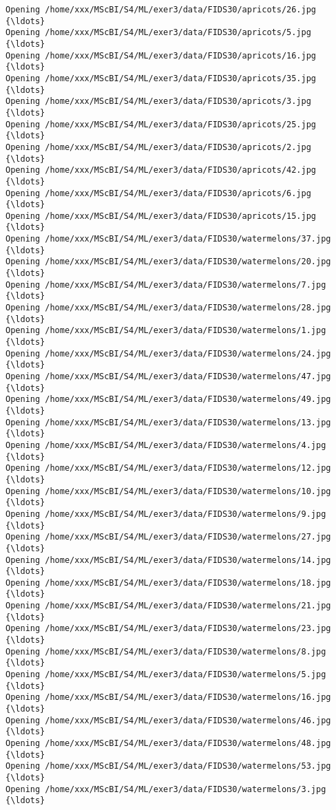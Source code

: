\documentclass[11pt]{article}
\begin{document}
\begin{Verbatim}[commandchars=\\\{\}]
Opening /home/xxx/MScBI/S4/ML/exer3/data/FIDS30/apricots/26.jpg  {\ldots}
Opening /home/xxx/MScBI/S4/ML/exer3/data/FIDS30/apricots/5.jpg  {\ldots}
Opening /home/xxx/MScBI/S4/ML/exer3/data/FIDS30/apricots/16.jpg  {\ldots}
Opening /home/xxx/MScBI/S4/ML/exer3/data/FIDS30/apricots/35.jpg  {\ldots}
Opening /home/xxx/MScBI/S4/ML/exer3/data/FIDS30/apricots/3.jpg  {\ldots}
Opening /home/xxx/MScBI/S4/ML/exer3/data/FIDS30/apricots/25.jpg  {\ldots}
Opening /home/xxx/MScBI/S4/ML/exer3/data/FIDS30/apricots/2.jpg  {\ldots}
Opening /home/xxx/MScBI/S4/ML/exer3/data/FIDS30/apricots/42.jpg  {\ldots}
Opening /home/xxx/MScBI/S4/ML/exer3/data/FIDS30/apricots/6.jpg  {\ldots}
Opening /home/xxx/MScBI/S4/ML/exer3/data/FIDS30/apricots/15.jpg  {\ldots}
Opening /home/xxx/MScBI/S4/ML/exer3/data/FIDS30/watermelons/37.jpg  {\ldots}
Opening /home/xxx/MScBI/S4/ML/exer3/data/FIDS30/watermelons/20.jpg  {\ldots}
Opening /home/xxx/MScBI/S4/ML/exer3/data/FIDS30/watermelons/7.jpg  {\ldots}
Opening /home/xxx/MScBI/S4/ML/exer3/data/FIDS30/watermelons/28.jpg  {\ldots}
Opening /home/xxx/MScBI/S4/ML/exer3/data/FIDS30/watermelons/1.jpg  {\ldots}
Opening /home/xxx/MScBI/S4/ML/exer3/data/FIDS30/watermelons/24.jpg  {\ldots}
Opening /home/xxx/MScBI/S4/ML/exer3/data/FIDS30/watermelons/47.jpg  {\ldots}
Opening /home/xxx/MScBI/S4/ML/exer3/data/FIDS30/watermelons/49.jpg  {\ldots}
Opening /home/xxx/MScBI/S4/ML/exer3/data/FIDS30/watermelons/13.jpg  {\ldots}
Opening /home/xxx/MScBI/S4/ML/exer3/data/FIDS30/watermelons/4.jpg  {\ldots}
Opening /home/xxx/MScBI/S4/ML/exer3/data/FIDS30/watermelons/12.jpg  {\ldots}
Opening /home/xxx/MScBI/S4/ML/exer3/data/FIDS30/watermelons/10.jpg  {\ldots}
Opening /home/xxx/MScBI/S4/ML/exer3/data/FIDS30/watermelons/9.jpg  {\ldots}
Opening /home/xxx/MScBI/S4/ML/exer3/data/FIDS30/watermelons/27.jpg  {\ldots}
Opening /home/xxx/MScBI/S4/ML/exer3/data/FIDS30/watermelons/14.jpg  {\ldots}
Opening /home/xxx/MScBI/S4/ML/exer3/data/FIDS30/watermelons/18.jpg  {\ldots}
Opening /home/xxx/MScBI/S4/ML/exer3/data/FIDS30/watermelons/21.jpg  {\ldots}
Opening /home/xxx/MScBI/S4/ML/exer3/data/FIDS30/watermelons/23.jpg  {\ldots}
Opening /home/xxx/MScBI/S4/ML/exer3/data/FIDS30/watermelons/8.jpg  {\ldots}
Opening /home/xxx/MScBI/S4/ML/exer3/data/FIDS30/watermelons/5.jpg  {\ldots}
Opening /home/xxx/MScBI/S4/ML/exer3/data/FIDS30/watermelons/16.jpg  {\ldots}
Opening /home/xxx/MScBI/S4/ML/exer3/data/FIDS30/watermelons/46.jpg  {\ldots}
Opening /home/xxx/MScBI/S4/ML/exer3/data/FIDS30/watermelons/48.jpg  {\ldots}
Opening /home/xxx/MScBI/S4/ML/exer3/data/FIDS30/watermelons/53.jpg  {\ldots}
Opening /home/xxx/MScBI/S4/ML/exer3/data/FIDS30/watermelons/3.jpg  {\ldots}

\end{Verbatim}
\end{document}
